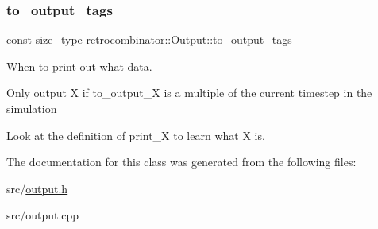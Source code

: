 \subsubsection{\texorpdfstring{to\+\_\+output\+\_\+tags}{to\_output\_tags}}
{\footnotesize\ttfamily const \hyperlink{namespaceretrocombinator_a8e1541b50cee66a791df4c437ccbb385}{size\+\_\+type} retrocombinator\+::\+Output\+::to\+\_\+output\+\_\+tags\hspace{0.3cm}{\ttfamily [private]}}



When to print out what data. 


\begin{DoxyItemize}
\item Only output X if {\ttfamily to\+\_\+output\+\_\+X} is a multiple of the current timestep in the simulation
\item Look at the definition of print\+\_\+\textquotesingle{}X\textquotesingle{} to learn what \textquotesingle{}X\textquotesingle{} is. 
\end{DoxyItemize}

The documentation for this class was generated from the following files\+:\begin{DoxyCompactItemize}
\item 
src/\hyperlink{output_8h}{output.\+h}\item 
src/output.\+cpp\end{DoxyCompactItemize}
